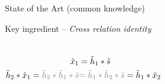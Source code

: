 % 

\subsection{\blaster}

\begin{frame}{State of the Art {\hfill\small (common knowledge)}\faBook}

    \begin{block}{Key ingredient -- \textit{Cross relation identity}}

        \vspace{-3mm}
        \begin{columns}[onlytextwidth]
            \begin{align*}
                \contMic_1 &= \contRIR_1 \contConv \contSrc
                \\\contRIR_2 \contConv \contMic_1 = \textcolor{gray}{\contRIR_2 \contConv \contRIR_1 \contConv \contSrc}
                    &\textcolor{gray}{= \contRIR_1 \contConv \contRIR_2 \contConv \contSrc} = \contRIR_1 \contConv \contMic_2
            \end{align*}

            \centering
        \end{columns}
    \end{block}


\end{frame}
